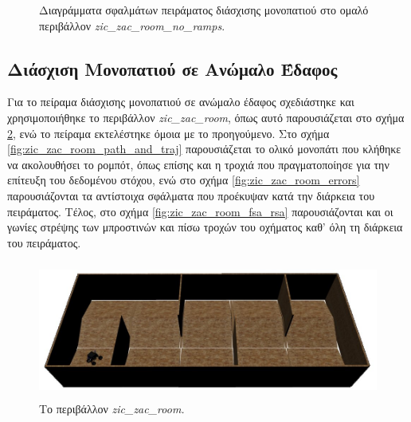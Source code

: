 \begin{figure}[!ht]
	\caption{Διαγράμματα σφαλμάτων πειράματος διάσχισης μονοπατιού στο ομαλό περιβάλλον \textit{zic{\_}zac{\_}room{\_}no{\_}ramps}.}
	\label{fig:zic_zac_room_no_ramps_errors}
\end{figure}

\FloatBarrier

\subsection{Διάσχιση Μονοπατιού σε Ανώμαλο Έδαφος}
Για το πείραμα διάσχισης μονοπατιού σε ανώμαλο έδαφος σχεδιάστηκε και χρησιμοποιήθηκε το περιβάλλον \textit{zic{\_}zac{\_}room}, όπως αυτό παρουσιάζεται στο σχήμα \ref{fig:zic_zac_room}, ενώ το πείραμα εκτελέστηκε όμοια με το προηγούμενο. Στο σχήμα \ref{fig:zic_zac_room_path_and_traj} παρουσιάζεται το ολικό μονοπάτι που κλήθηκε να ακολουθήσει το ρομπότ, όπως επίσης και η τροχιά που πραγματοποίησε για την επίτευξη του δεδομένου στόχου, ενώ στο σχήμα \ref{fig:zic_zac_room_errors} παρουσιάζονται τα αντίστοιχα σφάλματα που προέκυψαν κατά την διάρκεια του πειράματος. Τέλος, στο σχήμα \ref{fig:zic_zac_room_fsa_rsa} παρουσιάζονται και οι γωνίες στρέψης των μπροστινών και πίσω τροχών του οχήματος καθ' όλη τη διάρκεια του πειράματος.

\begin{figure}[!ht]
	\centering
	\includegraphics[height=4.5cm]{Chapters/Chapter5/Figures/ptc_experiments/zic_zac_room.jpg}
	\caption{Το περιβάλλον \textit{zic{\_}zac{\_}room.}}
	\label{fig:zic_zac_room}
\end{figure}	
	
